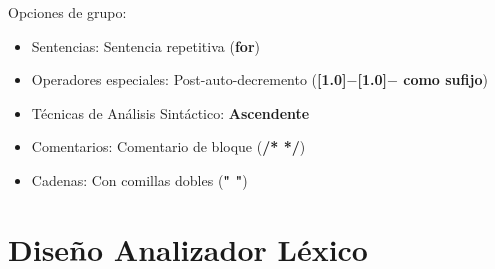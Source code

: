 \documentclass[11pt, , a4paper, titlepage]{article}
\newenvironment{myitemize}
{ \begin{itemize}
    \setlength{\itemsep}{0pt}
    \setlength{\parskip}{2pt}    }
{ \end{itemize}                  }
\newcommand{\minus}{\scalebox{0.75}[1.0]{$-$}}
\begin{document}
Opciones de grupo:
\begin{myitemize}
    \renewcommand{\labelitemi}{$\circ$}
    \item Sentencias: Sentencia repetitiva (\textbf{for})
    \item   Operadores especiales: Post-auto-decremento (\textbf{\minus \minus \hspace{0.1cm} como sufijo})
    \item     Técnicas de Análisis Sintáctico: \textbf{Ascendente}
    \item     Comentarios: Comentario de bloque (\textbf{/* */})
    \item Cadenas: Con comillas dobles (\textbf{" \phantom{} "})
\end{myitemize}
\clearpage

\section{Diseño Analizador Léxico}

\end{document}
